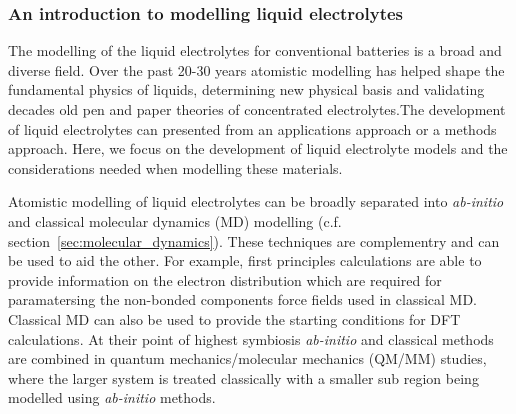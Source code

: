 \documentclass[../main.tex]{subfiles}
\begin{document}


\subsubsection{An introduction to modelling liquid electrolytes}
The modelling of the liquid electrolytes for conventional batteries is a broad and diverse field. Over the past 20-30 years atomistic modelling has helped shape the fundamental physics of liquids, determining new physical basis and validating decades old pen and paper theories of concentrated electrolytes.The development of liquid electrolytes can presented from an applications approach or a methods approach. Here, we focus on the development of liquid electrolyte models and the considerations needed when modelling these materials.

Atomistic modelling of liquid electrolytes can be broadly separated into \textit{ab-initio} and classical molecular dynamics (MD) modelling (c.f. section~\ref{sec:molecular_dynamics}). These techniques are complementry and can be used to aid the other. For example, first principles calculations are able to provide information on the electron distribution which are required for paramatersing the non-bonded components force fields used in classical MD.
Classical MD can also be used to provide the starting conditions for DFT calculations. At their point of highest symbiosis \textit{ab-initio} and classical methods are combined in quantum mechanics/molecular mechanics (QM/MM) studies, where the larger system is treated classically with a smaller sub region being modelled using \textit{ab-initio} methods.
\end{document}
